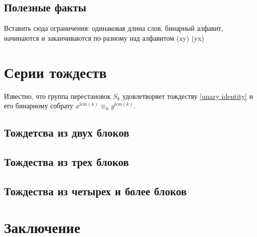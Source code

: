 \newpage
\subsection{Полезные факты}
Вставить сюда ограничения: 
	одинаковая длина слов,
	бинарный алфавит,
	начинаются и заканчиваются по-разному
	над алфавитом (xy) (yx) 

\newpage
\section{Серии тождеств}
Известно, что группа перестановок $S_k$ удовлетворяет тождеству \ref{unary identity}  и его бинарному собрату $x^{lcm(k)} \equiv_k y^{lcm(k)}$.


\subsection{Тождетсва из двух блоков}

\subsection{Тождества из трех блоков}
%

\subsection{Тождества из четырех и более блоков}

\newpage
\section{Заключение}